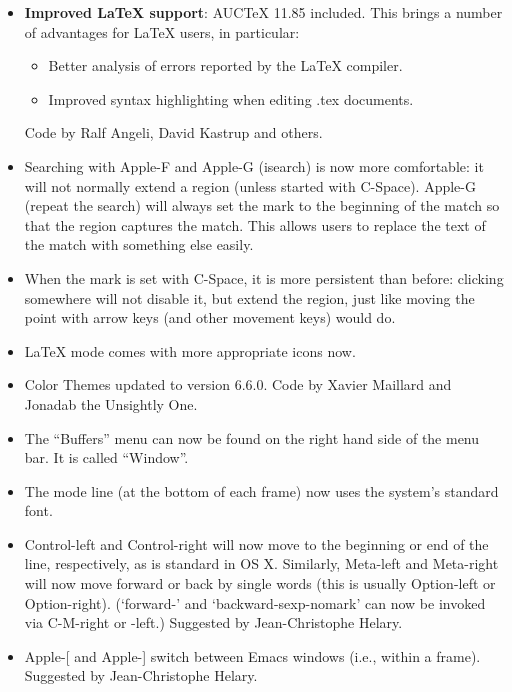 \begin{itemize}
\item \textbf{Improved LaTeX support}: AUCTeX 11.85 included. This brings a number of advantages for LaTeX users, in particular:
\begin{itemize}
\item Better analysis of errors reported by the LaTeX compiler.
\item Improved syntax highlighting when editing .tex documents.
\end{itemize}
Code by Ralf Angeli, David Kastrup and others.

\item Searching with Apple-F and Apple-G (isearch) is now more
  comfortable: it will not normally extend a region (unless started
  with C-Space). Apple-G (repeat the search) will always set the mark
  to the beginning of the match so that the region captures the match.
  This allows users to replace the text of the match with something
  else easily. 

\item When the mark is set with C-Space, it is more persistent than
  before: clicking somewhere will not disable it, but extend the
  region, just like moving the point with arrow keys (and other
  movement keys) would do.

\item LaTeX mode comes with more appropriate icons now.

\item Color Themes updated to version 6.6.0.
Code by Xavier Maillard and Jonadab the Unsightly One.

\item The ``Buffers'' menu can now be found on the right hand side of the menu bar.  It is called ``Window''.

\item The mode line (at the bottom of each frame) now uses the
  system's standard font.

\item Control-left and Control-right will now move to the beginning or
  end of the line, respectively, as is standard in OS X.  Similarly, 
Meta-left and Meta-right will now move forward or back by single
words (this is usually Option-left or Option-right).  (`forward-'
and `backward-sexp-nomark' can now be invoked via C-M-right or -left.)
Suggested by Jean-Christophe Helary.

\item Apple-[ and Apple-] switch between Emacs windows (i.e., within a
  frame).
 Suggested by Jean-Christophe Helary.


\end{itemize}
